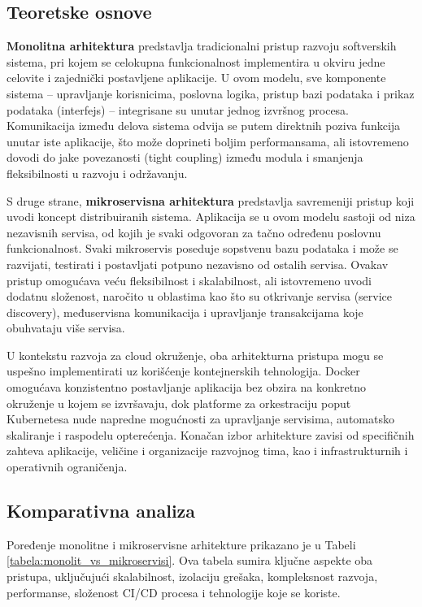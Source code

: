 \documentclass[12pt]{article}
\begin{document}
    \subsection{Teoretske osnove}

    \textbf{Monolitna arhitektura} predstavlja tradicionalni pristup razvoju softverskih sistema, pri kojem se celokupna funkcionalnost implementira u okviru jedne celovite i zajednički postavljene aplikacije. U ovom modelu, sve komponente sistema – upravljanje korisnicima, poslovna logika, pristup bazi podataka i prikaz podataka (interfejs) – integrisane su unutar jednog izvršnog procesa. Komunikacija između delova sistema odvija se putem direktnih poziva funkcija unutar iste aplikacije, što može doprineti boljim performansama, ali istovremeno dovodi do jake povezanosti (tight coupling) između modula i smanjenja fleksibilnosti u razvoju i održavanju.

    S druge strane, \textbf{mikroservisna arhitektura} predstavlja savremeniji pristup koji uvodi koncept distribuiranih sistema. Aplikacija se u ovom modelu sastoji od niza nezavisnih servisa, od kojih je svaki odgovoran za tačno određenu poslovnu funkcionalnost. Svaki mikroservis poseduje sopstvenu bazu podataka i može se razvijati, testirati i postavljati potpuno nezavisno od ostalih servisa. Ovakav pristup omogućava veću fleksibilnost i skalabilnost, ali istovremeno uvodi dodatnu složenost, naročito u oblastima kao što su otkrivanje servisa (service discovery), međuservisna komunikacija i upravljanje transakcijama koje obuhvataju više servisa.

    U kontekstu razvoja za cloud okruženje, oba arhitekturna pristupa mogu se uspešno implementirati uz korišćenje kontejnerskih tehnologija. Docker omogućava konzistentno postavljanje aplikacija bez obzira na konkretno okruženje u kojem se izvršavaju, dok platforme za orkestraciju poput Kubernetesa nude napredne mogućnosti za upravljanje servisima, automatsko skaliranje i raspodelu opterećenja. Konačan izbor arhitekture zavisi od specifičnih zahteva aplikacije, veličine i organizacije razvojnog tima, kao i infrastrukturnih i operativnih ograničenja.

    \subsection{Komparativna analiza}


    Poređenje monolitne i mikroservisne arhitekture prikazano je u Tabeli \ref{tabela:monolit_vs_mikroservisi}. Ova tabela sumira ključne aspekte oba pristupa, uključujući skalabilnost, izolaciju grešaka, kompleksnost razvoja, performanse, složenost CI/CD procesa i tehnologije koje se koriste. 
\end{document}
